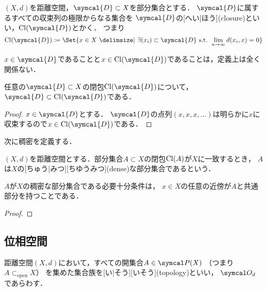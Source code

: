 \documentclass[../sotsu.tex]{subfiles}
\begin{document}
\begin{definition}[閉包]
    \label{dfn:closure-by-sequence}
    $(X, d)$を距離空間，$\symcal{D} \subset X$を部分集合とする．
    $\symcal{D}$に属するすべての収束列の極限からなる集合を
    $\symcal{D}$の[へい|ほう](closure)といい，$\cl{\symcal{D}}$とかく．
    つまり
    \begin{equation}
        \cl{\symcal{D}} \coloneq \Set{ x \in X  \given  \exists (x_i) \subset \symcal{D} \text{ s.t. } \lim_{n \to \infty} d(x_i, x) = 0 }
    \end{equation}
\end{definition}

$x \in \symcal{D}$であることと$x \in \cl{\symcal{D}}$であることは，定義上は全く関係ない．

\begin{corollary}
    任意の$\symcal{D} \subset X$の閉包$\cl{\symcal{D}}$について，
    $\symcal{D} \subset \cl{\symcal{D}}$である．
\end{corollary}

\begin{proof}
    $x \in \symcal{D}$とする．
    $\symcal{D}$の点列$(x, x, x, \dotsc)$は明らかに$x$に収束するので$x \in \cl{\symcal{D}}$である．
\end{proof}

次に稠密を定義する．

\begin{definition}[稠密]
    $(X, d)$を距離空間とする．部分集合$A \subset X$の閉包$\mathrm{Cl}(A)$が$X$に一致するとき，
    $A$は$X$の[ちゅう|みつ][ちゆうみつ](dense)な部分集合であるという．
\end{definition}

\begin{proposition}
    $A$が$X$の稠密な部分集合である必要十分条件は，
    $x \in X$の任意の近傍が$A$と共通部分を持つことである．
\end{proposition}

\begin{proof}
    
\end{proof}


\subsection{位相空間}

\begin{definition}
    \label{dfn:topology}
    距離空間$(X, d)$において，すべての開集合$A \in \pset(X)$
    （つまり$A \subset_{\text{open}} X$）
    を集めた集合族を[い|そう][いそう](topology)といい，
    $\topology_d$であらわす．
\end{definition}
\end{document}
